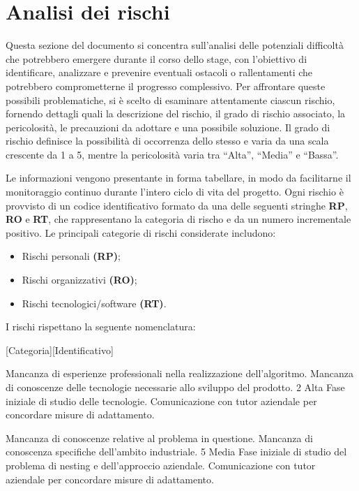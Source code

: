 \section{Analisi dei rischi}

Questa sezione del documento si concentra sull’analisi delle potenziali difficoltà che potrebbero emergere durante il corso dello stage, con l’obiettivo di identificare, analizzare e prevenire eventuali ostacoli o rallentamenti che potrebbero comprometterne il progresso complessivo. Per affrontare queste possibili problematiche, si è scelto di esaminare attentamente ciascun rischio, fornendo dettagli quali la descrizione del rischio, il grado di rischio associato, la pericolosità, le precauzioni da adottare e una possibile soluzione. Il grado di rischio definisce la possibilità di occorrenza dello stesso e varia da una scala crescente da 1 a 5, mentre la pericolosità varia tra “Alta”, “Media” e “Bassa”. 

Le informazioni vengono presentante in forma tabellare, in modo da facilitarne il monitoraggio continuo durante l’intero ciclo di vita del progetto. Ogni rischio è provvisto di un codice identificativo formato da una delle seguenti stringhe \textbf{RP}, \textbf{RO} e \textbf{RT}, che rappresentano la categoria di rischo e da un numero incrementale positivo. Le principali categorie di rischi considerate includono:
\begin{itemize}
    \item Rischi personali \textbf{(RP)};
    \item Rischi organizzativi \textbf{(RO)};
    \item Rischi tecnologici/software \textbf{(RT)}.
\end{itemize}
I rischi rispettano la seguente nomenclatura:
\begin{center}
    [Categoria][Identificativo]
\end{center}

{Mancanza di esperienze professionali nella realizzazione dell'algoritmo. Mancanza di conoscenze delle tecnologie necessarie allo sviluppo del prodotto.}
{2}
{Alta}
{Fase iniziale di studio delle tecnologie.}
{Comunicazione con tutor aziendale per concordare misure di adattamento.}

{Mancanza di conoscenze relative al problema in questione. Mancanza di conoscenza specifiche dell'ambito industriale.}
{5}
{Media}
{Fase iniziale di studio del problema di nesting e dell'approccio aziendale.}
{Comunicazione con tutor aziendale per concordare misure di adattamento.}

